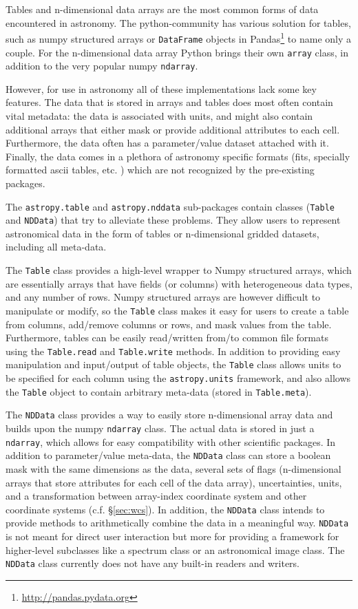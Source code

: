 \documentclass[traditabstract]{aa}
\begin{document}
Tables and n-dimensional data arrays are the most common forms of data
encountered in astronomy. The \gls{python}-community has various solution for
tables, such as \gls{numpy} structured arrays or \texttt{DataFrame} objects in Pandas\footnote{\url{http://pandas.pydata.org}} to name
only a couple. For the n-dimensional data array Python brings their own
\texttt{array} class, in addition to the very popular \gls{numpy}
\texttt{ndarray}.

However, for use in astronomy all of these implementations lack some key
features. The data that is stored in arrays and tables does most often contain
vital metadata: the data is associated with units, and might also contain
additional arrays that either mask or provide additional attributes to each
cell. Furthermore, the data often has a parameter/value dataset attached with
it. Finally, the data comes in a plethora of astronomy specific formats (fits,
specially formatted ascii tables, etc. ) which are not recognized by the
pre-existing packages.

The \texttt{astropy.table} and \texttt{astropy.nddata} sub-packages contain
classes (\texttt{Table} and \texttt{NDData}) that try to alleviate these problems.
They allow users to represent astronomical data in the form of tables or
n-dimensional gridded datasets, including all meta-data.

The \texttt{Table} class provides a high-level wrapper to Numpy structured
arrays, which are essentially arrays that have fields (or columns) with
heterogeneous data types, and any number of rows. Numpy structured arrays are
however difficult to manipulate or modify, so the \texttt{Table} class makes
it easy for users to create a table from columns, add/remove columns or rows,
and mask values from the table. Furthermore, tables can be easily read/written
from/to common file formats using the \texttt{Table.read} and
\texttt{Table.write} methods. In addition to providing easy manipulation and
input/output of table objects, the \texttt{Table} class allows units to be
specified for each column using the \texttt{astropy.units} framework, and also
allows the \texttt{Table} object to contain arbitrary meta-data (stored in
\texttt{Table.meta}).

The \texttt{NDData} class provides a way to easily store n-dimensional array
data and builds upon the \gls{numpy} \texttt{ndarray} class. The actual data
is stored in just a \texttt{ndarray}, which allows for easy compatibility with
other scientific packages. In addition to parameter/value meta-data, the
\texttt{NDData} class can store a boolean mask with the same dimensions as the
data, several sets of flags (n-dimensional arrays that store attributes for
each cell of the data array), uncertainties, units, and a transformation
between array-index coordinate system and other coordinate systems (c.f.
\S\ref{sec:wcs}). In addition, the \texttt{NDData} class intends to provide
methods to arithmetically combine the data in a meaningful way.
\texttt{NDData} is not meant for direct user interaction but more for
providing a framework for higher-level subclasses like a spectrum class or an
astronomical image class. The \texttt{NDData} class currently does not have any built-in readers
and writers.
\end{document}
